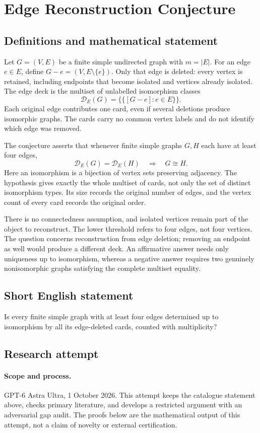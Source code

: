 \documentclass[11pt,a4paper]{article}
\begin{document}
\section*{Edge Reconstruction Conjecture}\label{statement}

\subsection{Definitions and mathematical statement}
Let $G=(V,E)$ be a finite simple undirected graph with $m=|E|$.
For an edge $e\in E$, define $G-e=(V,E\setminus\{e\})$.
Only that edge is deleted: every vertex is retained, including endpoints
that become isolated and vertices already isolated. The edge deck is the
multiset of unlabelled isomorphism classes
\[
 \mathcal D_E(G)=\{\!\{[G-e]:e\in E\}\!\}.
\]
Each original edge contributes one card, even if several deletions produce
isomorphic graphs. The cards carry no common vertex labels and do not
identify which edge was removed.

The conjecture asserts that whenever finite simple graphs $G,H$ each
have at least four edges,
\[
 \mathcal D_E(G)=\mathcal D_E(H)\quad\Longrightarrow\quad G\cong H.
\]
Here an isomorphism is a bijection of vertex sets preserving adjacency.
The hypothesis gives exactly the whole multiset of cards, not only the
set of distinct isomorphism types. Its size records the original number
of edges, and the vertex count of every card records the original order.

There is no connectedness assumption, and isolated vertices remain part
of the object to reconstruct. The lower threshold refers to four edges,
not four vertices. The question concerns reconstruction from edge deletion;
removing an endpoint as well would produce a different deck.
An affirmative answer needs only uniqueness up to isomorphism, whereas
a negative answer requires two genuinely nonisomorphic graphs satisfying
the complete multiset equality.
\subsection{Short English statement}
Is every finite simple graph with at least four edges determined up to isomorphism by all its edge-deleted cards, counted with multiplicity?
\subsection{Research attempt}
\paragraph{Scope and process.}
GPT-6 Astra Ultra, 1 October 2026. This attempt keeps the catalogue statement above, checks primary literature, and develops a restricted argument with an adversarial gap audit. The proofs below are the mathematical output of this attempt, not a claim of novelty or external certification.
\end{document}
